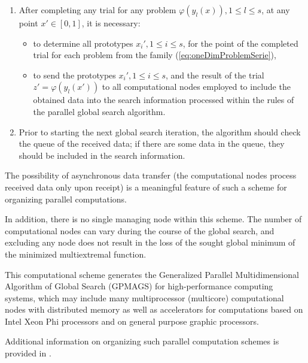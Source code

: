 \documentclass{gOMS2e}
\theoremstyle{plain}%
\theoremstyle{definition}
\theoremstyle{remark}
\begin{document}
\begin{enumerate}
\begin{enumerate}
    \item After completing any trial for any problem \(\varphi(y_l(x)),1\leqslant l\leqslant s\), at any point
    \(x'\in[0,1]\), it is necessary:
    \begin{itemize}
      \item to determine all prototypes \(x_i',1\leqslant i\leqslant s\), for the point of the completed trial
      for each problem from the family (\ref{eq:oneDimProblemSerie}),
      \item to send the prototypes \(x_i',1\leqslant i\leqslant s\), and the result of the
      trial \(z'=\varphi(y_l(x'))\) to all computational nodes employed to include the
      obtained data into the search information processed within the rules of the parallel global search algorithm.
    \end{itemize}
    \item Prior to starting the next global search iteration, the algorithm should
    check the queue of the received data; if there are some data in the queue,
    they should be included in the search information.
\end{enumerate}
\end{enumerate}
\par
The possibility of asynchronous data transfer (the computational nodes process received
data only upon receipt) is a meaningful feature of such a scheme for organizing parallel computations.
\par
In addition, there is no single managing node within this scheme. The number of
computational nodes can vary during the course of the global search, and excluding any
node does not result in the loss of the sought global minimum of the minimized multiextremal function.
\par
This computational scheme generates the Generalized Parallel Multidimensional Algorithm of
Global Search (GPMAGS) for high-performance computing systems, which may include many
multiprocessor (multicore) computational nodes with distributed memory as well as
accelerators for computations based on Intel Xeon Phi processors and on general purpose graphic processors.
\par
Additional information on organizing such parallel computation schemes is provided in \cite{gergelSidorov2015}.
\end{document}
